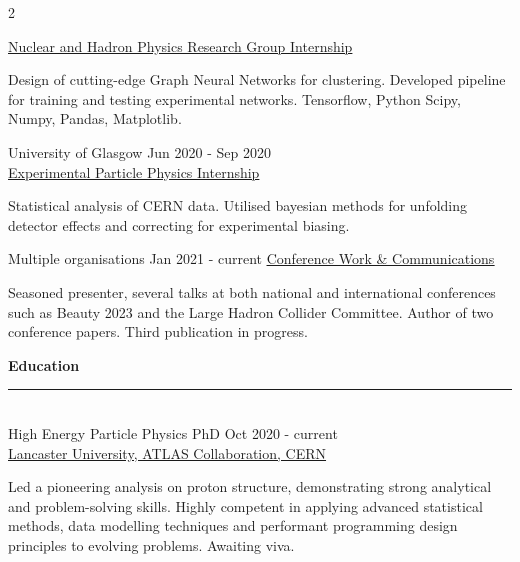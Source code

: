\documentclass[10pt]{article}
\begin{document}
\begin{multicols*}{2}
\begin{description}[leftmargin=6pt]
            \underline{Nuclear and Hadron Physics Research Group Internship} \vspace{-7pt}
            \begin{justify} \noindent Design of cutting-edge Graph Neural Networks for clustering. Developed pipeline for training and testing experimental networks. Tensorflow, Python Scipy, Numpy, Pandas, Matplotlib. \end{justify}
            \vspace{-3pt}
            {\firamedium University of Glasgow} \hfill Jun 2020 - Sep 2020\\ 
            \underline{Experimental Particle Physics Internship} \vspace{-7pt}
            \begin{justify} \noindent Statistical analysis of CERN data. Utilised bayesian methods for unfolding detector effects and correcting for experimental biasing. \end{justify}
            \vspace{-3pt}
            {\firamedium Multiple organisations} \hfill Jan 2021 - current 
            \underline{\href{https://www.research.lancs.ac.uk/portal/en/people/alina-hagan}{Conference Work \& Communications}} \vspace{-7pt}
            \begin{justify} \noindent Seasoned presenter, several talks at both national and international conferences such as Beauty 2023 and the Large Hadron Collider Committee. Author of two conference papers. Third publication in progress.\end{justify}

        \item \Large{\textbf{\textcolor{dt}{Education}}\vspace{-8pt} \textcolor{dt}{\rule{0.5\textwidth-10pt}{1pt}}}\normalsize\\\vspace{5pt}  
        {\firamedium High Energy Particle Physics PhD } \hfill Oct 2020 - current \\
        \underline{Lancaster University, ATLAS Collaboration, CERN} \vspace{-7pt}
        \begin{justify} \noindent Led a pioneering analysis on proton structure, demonstrating strong analytical and problem-solving skills. Highly competent in applying advanced statistical methods, data modelling techniques and performant programming design principles to evolving problems. Awaiting viva.\end{justify}
        

\end{description}
\end{multicols*}
\end{document}
